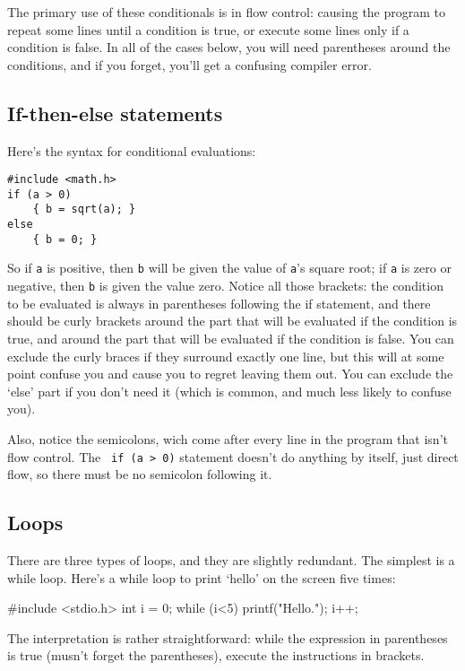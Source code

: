 \documentclass[12pt]{article}
\makeatletter
\def\ttindex#1{\index{#1@{\tt #1}}}
\makeatother
\begin{document}
The primary use of these conditionals is in flow control: causing
the program to repeat some lines until a condition is true, or execute some lines only if a condition is
false.  In all of the cases below, you will need parentheses around the conditions, and if you forget,
you'll get a confusing compiler error.

\subsection{If-then-else statements} Here's the syntax for conditional evaluations: \ttindex{if}

\begin{verbatim}
#include <math.h>
if (a > 0)
    { b = sqrt(a); }
else 
    { b = 0; }
\end{verbatim}
So if {\tt a} is positive, then {\tt b} will be given the value of {\tt a}'s square root; if {\tt a} is
zero or negative, then {\tt b} is given the value zero. Notice all those brackets: the condition to be
evaluated is always in parentheses following the if statement, and there should be curly brackets around
the part that will be evaluated if the condition is true, and around the part that will be evaluated if
the condition is false. You can exclude the curly braces if they surround exactly one line, but this
will at some point confuse you and cause you to regret leaving them out.
You can exclude the `else' part if you don't need it (which is common, and much less likely to confuse you).

Also, notice the semicolons, wich come after every line in the program that isn't flow control. The {\tt
if (a > 0)} statement doesn't do anything by itself, just direct flow, so there must be no semicolon following
it.

\subsection{Loops} There are three types of loops, and they are slightly redundant. The simplest is a while
loop. Here's a while loop to print `hello' on the screen five times:  \ttindex{while}

#include <stdio.h>
int i = 0;
while (i<5){
    printf("Hello.\n");
    i++;
}

The interpretation is rather straightforward: while the expression in parentheses is true (musn't forget
the parentheses), execute the instructions in brackets.
\end{document}
